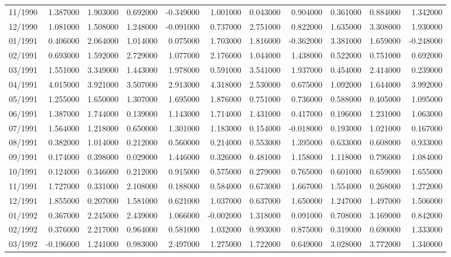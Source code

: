 \begin{tabular}{lrrrrrrrrrr}
11/1990 & 1.387000 & 1.903000 & 0.692000 & -0.349000 & 1.001000 & 0.043000 & 0.904000 & 0.361000 & 0.884000 & 1.342000 \\
12/1990 & 1.081000 & 1.508000 & 1.248000 & -0.091000 & 0.737000 & 2.751000 & 0.822000 & 1.635000 & 3.308000 & 1.930000 \\
01/1991 & 0.406000 & 2.064000 & 1.014000 & 0.075000 & 1.703000 & 1.816000 & -0.362000 & 3.381000 & 1.659000 & -0.248000 \\
02/1991 & 0.693000 & 1.592000 & 2.729000 & 1.077000 & 2.176000 & 1.044000 & 1.438000 & 0.522000 & 0.751000 & 0.692000 \\
03/1991 & 1.551000 & 3.349000 & 1.443000 & 1.978000 & 0.591000 & 3.541000 & 1.937000 & 0.454000 & 2.414000 & 0.239000 \\
04/1991 & 4.015000 & 3.921000 & 3.507000 & 2.913000 & 4.318000 & 2.530000 & 0.675000 & 1.092000 & 1.644000 & 3.992000 \\
05/1991 & 1.255000 & 1.650000 & 1.307000 & 1.695000 & 1.876000 & 0.751000 & 0.736000 & 0.588000 & 0.405000 & 1.095000 \\
06/1991 & 1.387000 & 1.744000 & 0.139000 & 1.143000 & 1.714000 & 1.431000 & 0.417000 & 0.196000 & 1.231000 & 1.063000 \\
07/1991 & 1.564000 & 1.218000 & 0.650000 & 1.301000 & 1.183000 & 0.154000 & -0.018000 & 0.193000 & 1.021000 & 0.167000 \\
08/1991 & 0.382000 & 1.014000 & 0.212000 & 0.560000 & 0.214000 & 0.553000 & 1.395000 & 0.633000 & 0.608000 & 0.933000 \\
09/1991 & 0.174000 & 0.398000 & 0.029000 & 1.446000 & 0.326000 & 0.481000 & 1.158000 & 1.118000 & 0.796000 & 1.084000 \\
10/1991 & 0.124000 & 0.346000 & 0.212000 & 0.915000 & 0.575000 & 0.279000 & 0.765000 & 0.601000 & 0.659000 & 1.655000 \\
11/1991 & 1.727000 & 0.331000 & 2.108000 & 0.188000 & 0.584000 & 0.673000 & 1.667000 & 1.554000 & 0.268000 & 1.272000 \\
12/1991 & 1.855000 & 0.207000 & 1.581000 & 0.621000 & 1.037000 & 0.637000 & 1.650000 & 1.247000 & 1.497000 & 1.506000 \\
01/1992 & 0.367000 & 2.245000 & 2.439000 & 1.066000 & -0.002000 & 1.318000 & 0.091000 & 0.708000 & 3.169000 & 0.842000 \\
02/1992 & 0.376000 & 2.217000 & 0.964000 & 0.581000 & 1.032000 & 0.993000 & 0.875000 & 0.319000 & 0.690000 & 1.333000 \\
03/1992 & -0.196000 & 1.241000 & 0.983000 & 2.497000 & 1.275000 & 1.722000 & 0.649000 & 3.028000 & 3.772000 & 1.340000 \\

\end{tabular}
